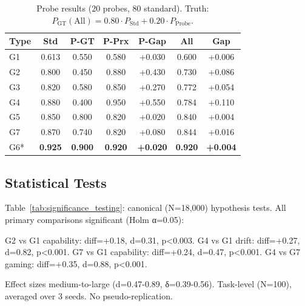 \documentclass[conference]{IEEEtran}
\begin{document}
\begin{table}[t]
\centering
\small
\caption{Probe results (20 probes, 80 standard). Truth: $P_{\text{GT}}(\text{All}) = 0.80·P_{\text{Std}} + 0.20·P_{\text{Probe}}$.}
\label{tab:drift_probes_table}
\begin{tabular}{lcccccc}
\toprule
\textbf{Type} & \textbf{Std} & \textbf{P-GT} & \textbf{P-Prx} & \textbf{P-Gap} & \textbf{All} & \textbf{Gap} \\
\midrule
G1 & 0.613 & 0.550 & 0.580 & +0.030 & 0.600 & +0.006 \\
G2 & 0.800 & 0.450 & 0.880 & +0.430 & 0.730 & +0.086 \\
G3 & 0.820 & 0.580 & 0.850 & +0.270 & 0.772 & +0.054 \\
G4 & 0.880 & 0.400 & 0.950 & +0.550 & 0.784 & +0.110 \\
G5 & 0.850 & 0.800 & 0.820 & +0.020 & 0.840 & +0.004 \\
G7 & 0.870 & 0.740 & 0.820 & +0.080 & 0.844 & +0.016 \\
G6* & \textbf{0.925} & \textbf{0.900} & \textbf{0.920} & \textbf{+0.020} & \textbf{0.920} & \textbf{+0.004} \\
\bottomrule
\end{tabular}
\end{table}

\subsection{Statistical Tests}

Table~\ref{tab:significance_testing}: canonical (N=18,000) hypothesis tests. All primary comparisons significant (Holm α=0.05):

G2 vs G1 capability: diff=+0.18, d=0.31, p<0.003.  
G4 vs G1 drift: diff=+0.27, d=0.82, p<0.001.  
G7 vs G1 capability: diff=+0.24, d=0.47, p<0.001.  
G4 vs G7 gaming: diff=+0.35, d=0.88, p<0.001.

Effect sizes medium-to-large (d=0.47-0.89, δ=0.39-0.56). Task-level (N=100), averaged over 3 seeds. No pseudo-replication.
\end{document}
